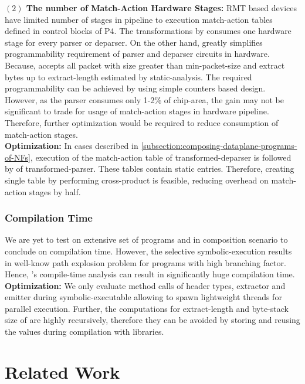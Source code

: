 \documentclass[letterpaper,twocolumn,10pt]{article}
\begin{document}
\textbf{$(2)$ The number of Match-Action Hardware Stages:} RMT based devices have limited number of stages in pipeline to execution match-action tables defined in control blocks of P4.
The transformations by \ucomp consumes one hardware stage for every parser or deparser. 
On the other hand, \ucomp greatly simplifies programmability requirement of parser and deparser circuits in hardware. 
Because, \ucomp accepts all packet with size greater than min-packet-size and extract bytes up to extract-length estimated by static-analysis. 
The required programmability can be achieved by using simple counters based design. 
However, as the parser consumes only 1-2\% of chip-area, the gain may not be significant to trade for usage of match-action stages in hardware pipeline. 
Therefore, further optimization would be required to reduce consumption of match-action stages.\\
\textbf{Optimization:} In cases described in \cref{subsection:composing-dataplane-programs-of-NFs}, execution of the match-action table of transformed-deparser is followed by of transformed-parser.
These tables contain static entries. Therefore, creating single table by performing cross-product is feasible, reducing overhead on match-action stages by half.




\subsubsection{Compilation Time}
We are yet to test \ucomp on extensive set of programs and in composition scenario to conclude on compilation time.
However, the selective symbolic-execution results in well-know path explosion problem for programs with high branching factor.
Hence, \ucomp's compile-time analysis can result in significantly huge compilation time.\\
\textbf{Optimization:}
We only evaluate method calls of header types, extractor and emitter during symbolic-executable allowing to spawn lightweight threads for parallel execution.
Further, the computations for extract-length and byte-stack size of \uprograms are highly recursively, therefore they can be avoided by storing and reusing the values during compilation with libraries.



\section{Related Work}
\end{document}
